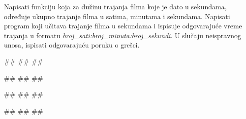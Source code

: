 \begin{Exercise}[label=POK_05] 
Napisati funkciju koja za dužinu trajanja filma koje je dato u sekundama, 
određuje ukupno trajanje filma u satima, minutama i sekundama. 
Napisati program koji učitava trajanje filma u sekundama i ispisuje odgovarajuće
vreme trajanja u formatu \textit{broj\_sati:broj\_minuta:broj\_sekundi}.
U slučaju neispravnog unosa, ispisati odgovarajuću poruku o grešci. 

\begin{miditest}
\begin{upotreba}{1}
#\naslovInt#
##
##
\end{upotreba}
\end{miditest}
\begin{miditest}
\begin{upotreba}{2}
#\naslovInt#
##
##
\end{upotreba}
\end{miditest}

\begin{miditest}
\begin{upotreba}{3}
#\naslovInt#
##
##
\end{upotreba}
\end{miditest}
\begin{miditest}
\begin{upotreba}{4}
#\naslovInt#
##
##
\end{upotreba}
\end{miditest}

\end{Exercise}
\ifresenja
\begin{Answer}[ref=POK_05]
\end{Answer}
\fi


